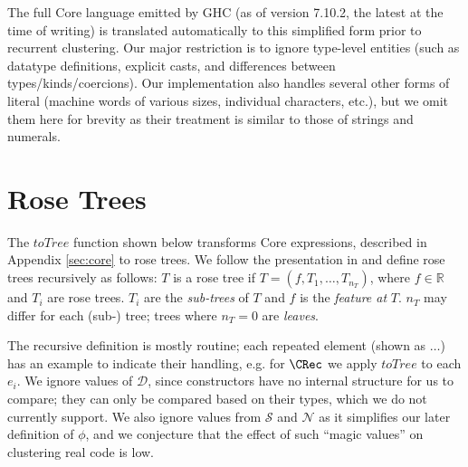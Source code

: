 The full Core language emitted by GHC (as of version 7.10.2, the latest at the
time of writing) is translated automatically to this simplified form prior to
recurrent clustering. Our major restriction is to ignore type-level entities
(such as datatype definitions, explicit casts, and differences between
types/kinds/coercions). Our implementation also handles several other forms of
literal (machine words of various sizes, individual characters, etc.), but we
omit them here for brevity as their treatment is similar to those of strings and
numerals.

\section{Rose Trees}\label{sec:rosetree}

The $toTree$ function shown below transforms Core expressions, described in
Appendix \ref{sec:core} to rose trees. We follow the presentation in
\cite{blundell2012bayesian} and define rose trees recursively as follows: $T$ is
a rose tree if $T = (f, T_1, \dots, T_{n_T})$, where $f \in \mathbb{R}$ and
$T_i$ are rose trees. $T_i$ are the \emph{sub-trees} of $T$ and $f$ is the
\emph{feature at} $T$. $n_T$ may differ for each (sub-) tree; trees where
$n_T = 0$ are \emph{leaves}.

The recursive definition is mostly routine; each repeated element (shown as
$\dots$) has an example to indicate their handling, e.g. for $\CRec$ we apply
$toTree$ to each $e_i$. We ignore values of $\mathcal{D}$, since constructors
have no internal structure for us to compare; they can only be compared based on
their types, which we do not currently support. We also ignore values from
$\mathcal{S}$ and $\mathcal{N}$ as it simplifies our later definition of $\phi$,
and we conjecture that the effect of such ``magic values'' on clustering real
code is low.

